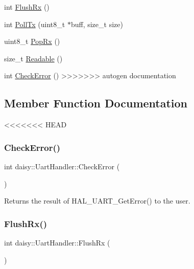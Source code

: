 \begin{DoxyCompactItemize}
\item 
int \hyperlink{classdaisy_1_1_uart_handler_a7ca4eb52ebbf541f979282219b3fc674}{Flush\+Rx} ()
\item 
int \hyperlink{classdaisy_1_1_uart_handler_ad2a5e2326d8f7053a3f84600b1fbbc0e}{Poll\+Tx} (uint8\+\_\+t $\ast$buff, size\+\_\+t size)
\item 
uint8\+\_\+t \hyperlink{classdaisy_1_1_uart_handler_a9a20af2a7980c754800408b263b78161}{Pop\+Rx} ()
\item 
size\+\_\+t \hyperlink{classdaisy_1_1_uart_handler_a536b3b004e5f9912dcc5c7d2f4ba9554}{Readable} ()
\item 
int \hyperlink{classdaisy_1_1_uart_handler_af45ffee5f49aeb10328a8844671fda8a}{Check\+Error} ()
>>>>>>> autogen documentation
\end{DoxyCompactItemize}


\subsection{Member Function Documentation}
<<<<<<< HEAD
\mbox{\label{classdaisy_1_1_uart_handler_ada2266b23e77dde305b229b7814604fe}} 
\subsubsection{\texorpdfstring{Check\+Error()}{CheckError()}}
{\footnotesize\ttfamily int daisy\+::\+Uart\+Handler\+::\+Check\+Error (\begin{DoxyParamCaption}{ }\end{DoxyParamCaption})}

Returns the result of H\+A\+L\+\_\+\+U\+A\+R\+T\+\_\+\+Get\+Error() to the user. \mbox{\label{classdaisy_1_1_uart_handler_aa7c66d512b976542a71d10666c415aa3}} 
\subsubsection{\texorpdfstring{Flush\+Rx()}{FlushRx()}}
{\footnotesize\ttfamily int daisy\+::\+Uart\+Handler\+::\+Flush\+Rx (\begin{DoxyParamCaption}{ }\end{DoxyParamCaption})}

